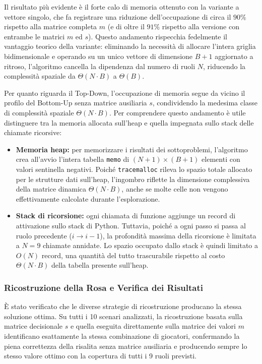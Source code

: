 Il risultato più evidente è il forte calo di memoria ottenuto con la variante a vettore singolo, che fa registrare una riduzione dell'occupazione di circa il $90\%$ rispetto alla matrice completa $m$ (e di oltre il $91\%$ rispetto alla versione con entrambe le matrici $m$ ed $s$). Questo andamento rispecchia fedelmente il vantaggio teorico della variante: eliminando la necessità di allocare l'intera griglia bidimensionale e operando su un unico vettore di dimensione $B + 1$ aggiornato a ritroso, l'algoritmo cancella la dipendenza dal numero di ruoli $N$, riducendo la complessità spaziale da $\Theta(N \cdot B)$ a $\Theta(B)$.

Per quanto riguarda il Top-Down, l'occupazione di memoria segue da vicino il profilo del Bottom-Up senza matrice ausiliaria $s$, condividendo la medesima classe di complessità spaziale $\Theta(N \cdot B)$. Per comprendere questo andamento è utile distinguere tra la memoria allocata sull'heap e quella impegnata sullo stack delle chiamate ricorsive:
\begin{itemize}
	\item \textbf{Memoria heap:} per memorizzare i risultati dei sottoproblemi, l'algoritmo crea all'avvio l'intera tabella \texttt{memo} di $(N+1) \times (B+1)$ elementi con valori sentinella negativi. Poiché \texttt{tracemalloc} rileva lo spazio totale allocato per le strutture dati sull'heap, l'ingombro riflette la dimensione complessiva della matrice dinamica $\Theta(N \cdot B)$, anche se molte celle non vengono effettivamente calcolate durante l'esplorazione.
	\item \textbf{Stack di ricorsione:} ogni chiamata di funzione aggiunge un record di attivazione sullo stack di Python. Tuttavia, poiché a ogni passo si passa al ruolo precedente ($i \to i-1$), la profondità massima della ricorsione è limitata a $N = 9$ chiamate annidate. Lo spazio occupato dallo stack è quindi limitato a $O(N)$ record, una quantità del tutto trascurabile rispetto al costo $\Theta(N \cdot B)$ della tabella presente sull'heap.
\end{itemize}

\subsubsection{Ricostruzione della Rosa e Verifica dei Risultati}
È stato verificato che le diverse strategie di ricostruzione producano la stessa soluzione ottima. Su tutti i 10 scenari analizzati, la ricostruzione basata sulla matrice decisionale $s$ e quella eseguita direttamente sulla matrice dei valori $m$ identificano esattamente la stessa combinazione di giocatori, confermando la piena correttezza della risalita senza matrice ausiliaria e producendo sempre lo stesso valore ottimo con la copertura di tutti i 9 ruoli previsti.


